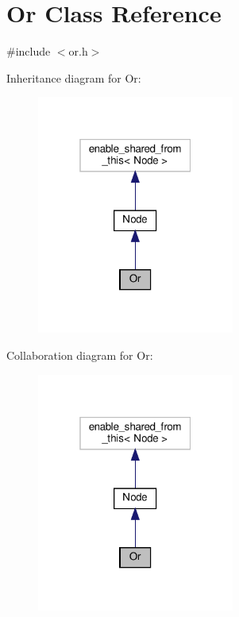 \hypertarget{class_or}{}\section{Or Class Reference}
\label{class_or}


{\ttfamily \#include $<$or.\+h$>$}



Inheritance diagram for Or\+:\nopagebreak
\begin{figure}[H]
\begin{center}
\leavevmode
\includegraphics[width=184pt]{d1/de9/class_or__inherit__graph}
\end{center}
\end{figure}


Collaboration diagram for Or\+:\nopagebreak
\begin{figure}[H]
\begin{center}
\leavevmode
\includegraphics[width=184pt]{d3/dd4/class_or__coll__graph}
\end{center}
\end{figure}
